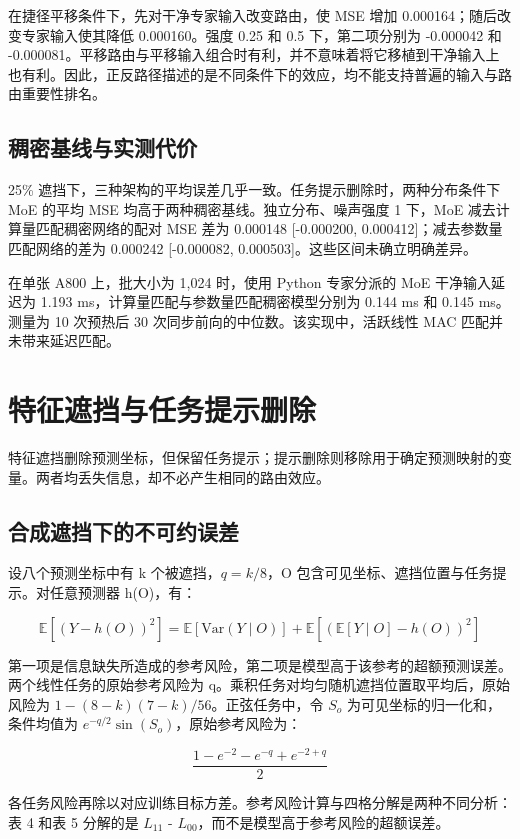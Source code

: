 \documentclass[10pt,letterpaper]{article}
\begin{document}
在捷径平移条件下，先对干净专家输入改变路由，使 MSE 增加 0.000164；随后改变专家输入使其降低 0.000160。强度 0.25 和 0.5 下，第二项分别为 -0.000042 和 -0.000081。平移路由与平移输入组合时有利，并不意味着将它移植到干净输入上也有利。因此，正反路径描述的是不同条件下的效应，均不能支持普遍的输入与路由重要性排名。


\subsection{稠密基线与实测代价}

25\% 遮挡下，三种架构的平均误差几乎一致。任务提示删除时，两种分布条件下 MoE 的平均 MSE 均高于两种稠密基线。独立分布、噪声强度 1 下，MoE 减去计算量匹配稠密网络的配对 MSE 差为 0.000148 [-0.000200, 0.000412]；减去参数量匹配网络的差为 0.000242 [-0.000082, 0.000503]。这些区间未确立明确差异。


在单张 A800 上，批大小为 1,024 时，使用 Python 专家分派的 MoE 干净输入延迟为 1.193 ms，计算量匹配与参数量匹配稠密模型分别为 0.144 ms 和 0.145 ms。测量为 10 次预热后 30 次同步前向的中位数。该实现中，活跃线性 MAC 匹配并未带来延迟匹配。


\FloatBarrier

\section{特征遮挡与任务提示删除}

特征遮挡删除预测坐标，但保留任务提示；提示删除则移除用于确定预测映射的变量。两者均丢失信息，却不必产生相同的路由效应。


\subsection{合成遮挡下的不可约误差}

设八个预测坐标中有 k 个被遮挡，$q=k/8$，O 包含可见坐标、遮挡位置与任务提示。对任意预测器 h(O)，有：


\[
\mathbb{E}[(Y-h(O))^2]=\mathbb{E}[\mathrm{Var}(Y\mid O)]+\mathbb{E}[(\mathbb{E}[Y\mid O]-h(O))^2]
\]

第一项是信息缺失所造成的参考风险，第二项是模型高于该参考的超额预测误差。两个线性任务的原始参考风险为 q。乘积任务对均匀随机遮挡位置取平均后，原始风险为 $1-(8-k)(7-k)/56$。正弦任务中，令 $S_{o}$ 为可见坐标的归一化和，条件均值为 $e^{-q/2}\sin(S_o)$，原始参考风险为：


\[
\frac{1-e^{-2}-e^{-q}+e^{-2+q}}{2}
\]

各任务风险再除以对应训练目标方差。参考风险计算与四格分解是两种不同分析：表 4 和表 5 分解的是 $L_{11}$ - $L_{00}$，而不是模型高于参考风险的超额误差。
\end{document}

